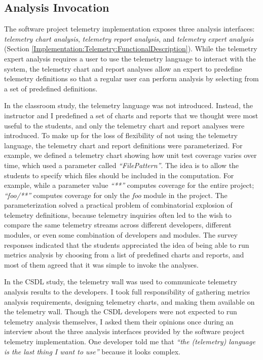 \subsection{Analysis Invocation}

The software project telemetry implementation exposes three analysis interfaces: \textit{telemetry chart analysis}, \textit{telemetry report analysis}, and \textit{telemetry expert analysis} (Section \ref{Implementation:Telemetry:FunctionalDescription}). While the telemetry expert analysis requires a user to use the telemetry language to interact with the system, the telemetry chart and report analyses allow an expert to predefine telemetry definitions so that a regular user can perform analysis by selecting from a set of predefined definitions.

In the classroom study, the telemetry language was not introduced. Instead, the instructor and I predefined a set of charts and reports that we thought were most useful to the students, and only the telemetry chart and report analyses were introduced. To make up for the loss of flexibility of not using the telemetry language, the telemetry chart and report definitions were parameterized. For example, we defined a telemetry chart showing how unit test coverage varies over time, which used a parameter called \textit{``FilePattern''}. The idea is to allow the students to specify which files should be included in the computation. For example, while a parameter value \textit{``**''} computes coverage for the entire project; \textit{``foo/**''} computes coverage for only the \textit{foo} module in the project. The parameterization solved a practical problem of combinatorial explosion of telemetry definitions, because telemetry inquiries often led to the wish to compare the same telemetry streams across different developers, different modules, or even some combination of developers and modules. 
The survey responses indicated that the students appreciated the idea of being able to run metrics analysis by choosing from a list of predefined charts and reports, and most of them agreed that it was simple to invoke the analyses.

In the CSDL study, the telemetry wall was used to communicate telemetry analysis results to the developers. I took full responsibility of gathering metrics analysis requirements, designing telemetry charts, and making them available on the telemetry wall. Though the CSDL developers were not expected to run telemetry analysis themselves, I asked them their opinions once during an interview about the three analysis interfaces provided by the software project telemetry implementation. One developer told me that \textit{``the (telemetry) language is the last thing I want to use''} because it looks complex.

